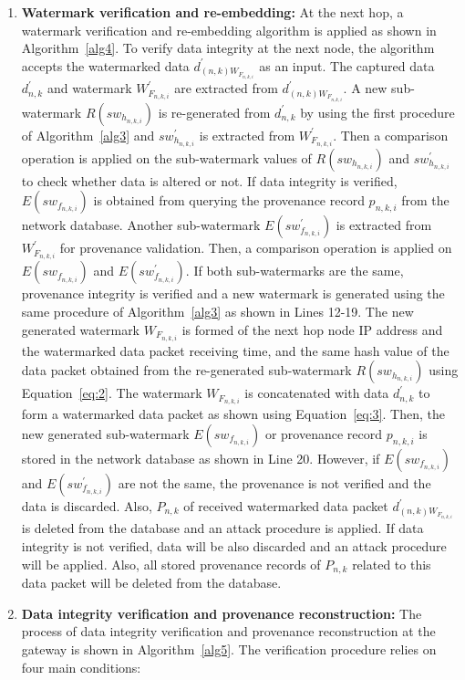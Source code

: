 \documentclass{llncs}
\begin{document}
\begin{enumerate}
    \item \textbf{Watermark verification and re-embedding:} At the next hop, a watermark verification and re-embedding algorithm is applied as shown in Algorithm~\ref{alg4}. To verify data integrity at the next node, the algorithm accepts the watermarked data $d^{'}_{(n,k)W_{F_{n,k,i}}}$ as an input. The captured data $d^{'}_{n,k}$ and watermark $W^{'}_{F_{n,k,i}}$ are extracted from $d^{'}_{(n,k)W_{F_{n,k,i}}}$. A new sub-watermark $R(sw_{h_{n,k,i}})$ is re-generated from $d^{'}_{n,k}$ by using the first procedure of Algorithm~\ref{alg3} and $sw^{'}_{h_{n,k,i}}$ is extracted from $W^{'}_{F_{n,k,i}}$. Then a comparison operation is applied on the sub-watermark values of $R(sw_{h_{n,k,i}})$ and $sw^{'}_{h_{n,k,i}}$ to check whether data is altered or not. If data integrity is verified, $E(sw_{f_{n,k,i}})$ is obtained from querying the provenance record $p_{n,k,i}$ from the network database. Another sub-watermark $E(sw^{'}_{f_{n,k,i}})$ is extracted from $W^{'}_{F_{n,k,i}}$ for provenance validation. Then, a comparison operation is applied on $E(sw_{f_{n,k,i}})$ and $E(sw^{'}_{f_{n,k,i}})$. If both sub-watermarks are the same, provenance integrity is verified and a new watermark is generated using the same procedure of Algorithm~\ref{alg3} as shown in Lines 12-19. The new generated watermark $W_{F_{n,k,i}}$ is formed of the next hop node IP address and the watermarked data packet receiving time, and the same hash value of the data packet obtained from the re-generated sub-watermark $R(sw_{h_{n,k,i}})$ using Equation~\eqref{eq:2}. The watermark $W_{F_{n,k,i}}$ is concatenated with data $d^{'}_{n,k}$ to form a watermarked data packet as shown using Equation~\eqref{eq:3}. Then, the new generated sub-watermark $E(sw_{f_{n,k,i}})$ or provenance record $p_{n,k,i}$ is stored in the network database as shown in Line 20. However, if $E(sw_{f_{n,k,i}})$ and $E(sw^{'}_{f_{n,k,i}})$ are not the same, the provenance is not verified and the data is discarded. Also, $P_{n,k}$ of received watermarked data packet $d^{'}_{(n,k)W_{F_{n,k,i}}}$ is deleted from the database and an attack procedure is applied. If data integrity is not verified, data will be also discarded and an attack procedure will be applied. Also, all stored provenance records of $P_{n,k}$ related to this data packet will be deleted from the database. 
    
    
    \item \textbf{Data integrity verification and provenance reconstruction:} The process of data integrity verification and provenance reconstruction at the gateway is shown in Algorithm~\ref{alg5}. The verification procedure relies on four main conditions:
    

\end{enumerate}
\end{document}
